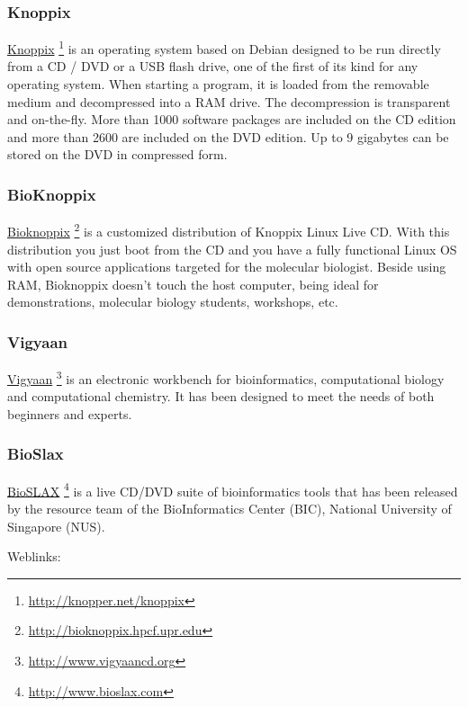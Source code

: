 \documentclass[a4paper,11pt,english]{sphinxmanual}
\begin{document}
\subsubsection{Knoppix}
\label{ReadingList:knoppix}
\href{http://knopper.net/knoppix}{Knoppix} \footnote{
\href{http://knopper.net/knoppix}{http://knopper.net/knoppix}
}  is an operating system based on Debian designed to be run directly from a CD / DVD or a
USB flash drive, one of the first of its kind for any operating system. When starting a program, it is
loaded from the removable medium and decompressed into a RAM drive. The decompression is
transparent and on-the-fly. More than 1000 software packages are included on the CD edition and
more than 2600 are included on the DVD edition. Up to 9 gigabytes can be stored on the DVD in
compressed form.


\subsubsection{BioKnoppix}
\label{ReadingList:bioknoppix}
\href{http://bioknoppix.hpcf.upr.edu}{Bioknoppix} \footnote{
\href{http://bioknoppix.hpcf.upr.edu}{http://bioknoppix.hpcf.upr.edu}
} is a customized distribution of Knoppix Linux Live CD. With this distribution you just
boot from the CD and you have a fully functional Linux OS with open source applications targeted
for the molecular biologist. Beside using RAM, Bioknoppix doesn't touch the host computer, being
ideal for demonstrations, molecular biology students, workshops, etc.


\subsubsection{Vigyaan}
\label{ReadingList:vigyaan}
\href{http://www.vigyaancd.org}{Vigyaan} \footnote{
\href{http://www.vigyaancd.org}{http://www.vigyaancd.org}
} is an electronic workbench for bioinformatics, computational biology and computational
chemistry. It has been designed to meet the needs of both beginners and experts.


\subsubsection{BioSlax}
\label{ReadingList:bioslax}
\href{http://www.bioslax.com}{BioSLAX} \footnote{
\href{http://www.bioslax.com}{http://www.bioslax.com}
} is a live CD/DVD suite of bioinformatics tools that has been released by the resource team
of the BioInformatics Center (BIC), National University of Singapore (NUS).
\begin{description}
\item[{Weblinks:}] \leavevmode
\end{description}
\end{document}
